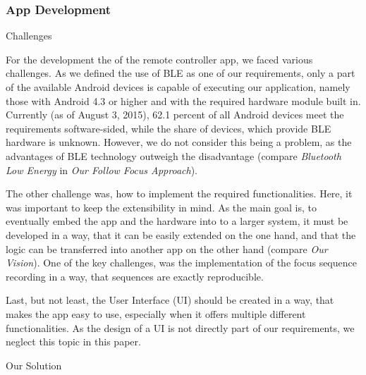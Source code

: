 \documentclass{sigchi}
\begin{document}
\subsubsection{App Development}
Challenges

For the development the of the remote controller app, we faced various challenges. As we defined the use of BLE as one of our requirements, only a part of the available Android devices is capable of executing our application, namely those with Android 4.3 or higher and with the required hardware module built in. Currently (as of August 3, 2015), 62.1 percent of all Android devices meet the requirements software-sided, while the share of devices, which provide BLE hardware is unknown. \cite{devand} However, we do not consider this being a problem, as the advantages of BLE technology outweigh the disadvantage (compare \textit{Bluetooth Low Energy} in \textit{Our Follow Focus Approach}).

The other challenge was, how to implement the required functionalities. Here, it was important to keep the extensibility in mind. As the main goal is, to eventually embed the app and the hardware into to a larger system, it must be developed in a way, that it can be easily extended on the one hand, and that the logic can be transferred into another app on the other hand (compare \textit{Our Vision}). One of the key challenges, was the implementation of the focus sequence recording in a way, that sequences are exactly reproducible. 

Last, but not least, the User Interface (UI) should be created in a way, that makes the app easy to use, especially when it offers multiple different functionalities. As the design of a UI is not directly part of our requirements, we neglect this topic in this paper. 


Our Solution
\end{document}
